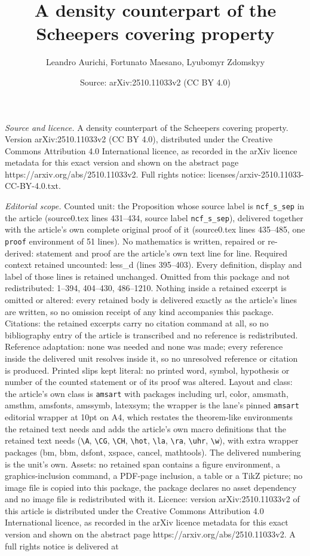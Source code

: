 \documentclass[10pt,a4paper]{amsart}
\title[A density counterpart of the Scheepers covering property]{A density counterpart of the Scheepers covering property}
\author{Leandro Aurichi, Fortunato Maesano, Lyubomyr Zdomskyy}
\date{Source: arXiv:2510.11033v2 (CC BY 4.0)}
\begin{document}
\maketitle

\noindent\emph{Source and licence.} A density counterpart of the Scheepers covering property. Version arXiv:2510.11033v2 (CC BY 4.0), distributed under the Creative Commons Attribution 4.0 International licence, as recorded in the arXiv licence metadata for this exact version and shown on the abstract page https://arxiv.org/abs/2510.11033v2. Full rights notice: licenses/arxiv-2510.11033-CC-BY-4.0.txt.\par\smallskip

\noindent\textit{Editorial scope.} Counted unit: the Proposition whose source label is \texttt{ncf\_s\_sep} in the article (source0.tex lines 431--434, source label \texttt{ncf\_s\_sep}), delivered together with the article's own complete original proof of it (source0.tex lines 435--485, one \texttt{proof} environment of 51 lines). No mathematics is written, repaired or re-derived: statement and proof are the article's own text line for line. Required context retained uncounted: less\_d (lines 395--403). Every definition, display and label of those lines is retained unchanged. Omitted from this package and not redistributed: 1--394, 404--430, 486--1210. Nothing inside a retained excerpt is omitted or altered: every retained body is delivered exactly as the article's lines are written, so no omission receipt of any kind accompanies this package. Citations: the retained excerpts carry no citation command at all, so no bibliography entry of the article is transcribed and no reference is redistributed. Reference adaptation: none was needed and none was made; every reference inside the delivered unit resolves inside it, so no unresolved reference or citation is produced. Printed slips kept literal: no printed word, symbol, hypothesis or number of the counted statement or of its proof was altered. Layout and class: the article's own class is \texttt{amsart} with packages including url, color, amsmath, amsthm, amsfonts, amssymb, latexsym; the wrapper is the lane's pinned \texttt{amsart} editorial wrapper at 10pt on A4, which restates the theorem-like environments the retained text needs and adds the article's own macro definitions that the retained text needs (\texttt{\textbackslash A}, \texttt{\textbackslash CG}, \texttt{\textbackslash CH}, \texttt{\textbackslash hot}, \texttt{\textbackslash la}, \texttt{\textbackslash ra}, \texttt{\textbackslash uhr}, \texttt{\textbackslash w}), with extra wrapper packages (bm, bbm, dsfont, xspace, cancel, mathtools). The delivered numbering is the unit's own. Assets: no retained span contains a figure environment, a graphics-inclusion command, a PDF-page inclusion, a table or a TikZ picture; no image file is copied into this package, the package declares no asset dependency and no image file is redistributed with it. Licence: version arXiv:2510.11033v2 of this article is distributed under the Creative Commons Attribution 4.0 International licence, as recorded in the arXiv licence metadata for this exact version and shown on the abstract page https://arxiv.org/abs/2510.11033v2. A full rights notice is delivered at 
\end{document}
